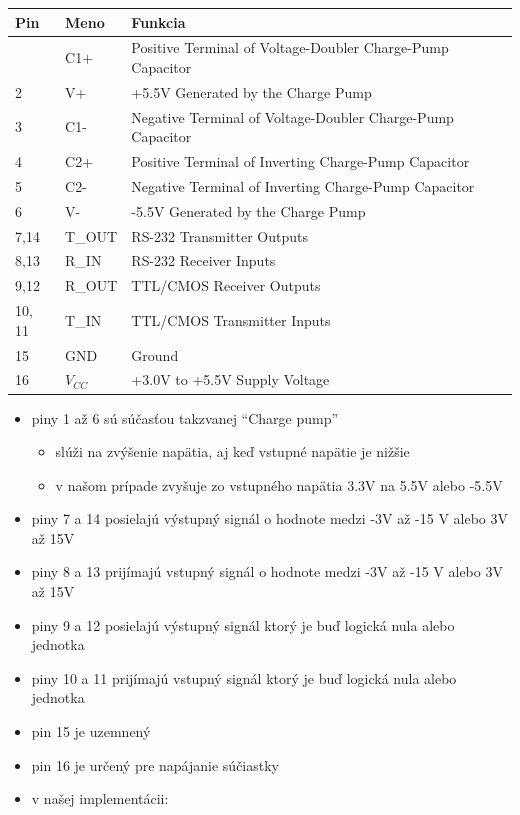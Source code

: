\documentclass[12pt, twoside]{book}
\begin{document}
\begin{itemize}
  \begin{longtable}[]{@{}lll@{}}
  \toprule\noalign{}
  Pin & Meno & Funkcia \\
  \midrule\noalign{}
  \endhead
  \bottomrule\noalign{}
  \endlastfoot
  1 & C1+ & Positive Terminal of Voltage-Doubler Charge-Pump
  Capacitor \\
  2 & V+ & +5.5V Generated by the Charge Pump \\
  3 & C1- & Negative Terminal of Voltage-Doubler Charge-Pump
  Capacitor \\
  4 & C2+ & Positive Terminal of Inverting Charge-Pump Capacitor \\
  5 & C2- & Negative Terminal of Inverting Charge-Pump Capacitor \\
  6 & V- & -5.5V Generated by the Charge Pump \\
  7,14 & T\_OUT & RS-232 Transmitter Outputs \\
  8,13 & R\_IN & RS-232 Receiver Inputs \\
  9,12 & R\_OUT & TTL/CMOS Receiver Outputs \\
  10, 11 & T\_IN & TTL/CMOS Transmitter Inputs \\
  15 & GND & Ground \\
  16 & $V_{CC}$ & +3.0V to +5.5V Supply Voltage \\
  \end{longtable}

  \begin{itemize}
  \item
    piny 1 až 6 sú súčasťou takzvanej ``Charge pump''

    \begin{itemize}
    \item
      slúži na zvýšenie napätia, aj keď vstupné napätie je nižšie
    \item
      v našom prípade zvyšuje zo vstupného napätia 3.3V na 5.5V alebo
      -5.5V
    \end{itemize}
  \item
    piny 7 a 14 posielajú výstupný signál o hodnote medzi -3V až -15 V
    alebo 3V až 15V
  \item
    piny 8 a 13 prijímajú vstupný signál o hodnote medzi -3V až -15 V
    alebo 3V až 15V
  \item
    piny 9 a 12 posielajú výstupný signál ktorý je buď logická nula
    alebo jednotka
  \item
    piny 10 a 11 prijímajú vstupný signál ktorý je buď logická nula
    alebo jednotka
  \item
    pin 15 je uzemnený
  \item
    pin 16 je určený pre napájanie súčiastky
  \item
    v našej implementácii:


\end{itemize}
\end{itemize}
\end{document}
